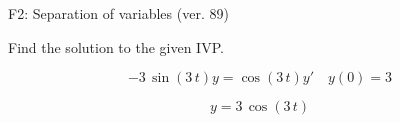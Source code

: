 \begin{exercise}
  \begin{exerciseTitle}F2: Separation of variables (ver. 89)\end{exerciseTitle}
  \begin{exerciseStatement}
    
Find the solution to the given IVP.

    
\[-3 \, \sin\left(3 \, t\right) y= \cos\left(3 \, t\right) y'\hspace{1em} y\left( 0 \right)= 3\]

  \end{exerciseStatement}
  \begin{exerciseAnswer}
    
\[y= 3 \, \cos\left(3 \, t\right)\]

  \end{exerciseAnswer}
\end{exercise}